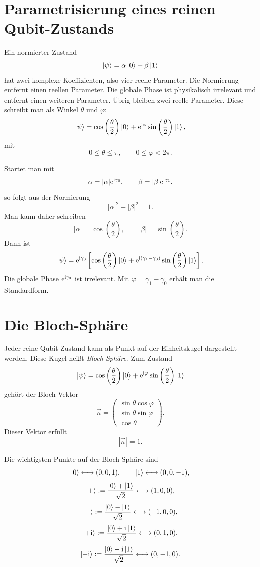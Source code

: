 \section{Parametrisierung eines reinen Qubit-Zustands}

Ein normierter Zustand
\[
    \left|\psi\right\rangle=\alpha\left|0\right\rangle+\beta\left|1\right\rangle
\]
hat zwei komplexe Koeffizienten, also vier reelle Parameter. Die Normierung entfernt einen reellen Parameter. Die globale Phase ist physikalisch irrelevant und entfernt einen weiteren Parameter. Übrig bleiben zwei reelle Parameter. Diese schreibt man als Winkel \(\theta\) und \(\varphi\):
\[
    \left|\psi\right\rangle
    =\cos\left(\frac{\theta}{2}\right)\left|0\right\rangle
    +\mathrm{e}^{\mathrm{i}\varphi}\sin\left(\frac{\theta}{2}\right)\left|1\right\rangle,
\]
mit
\[
    0\le \theta\le \pi,
    \qquad
    0\le \varphi<2\pi.
\]

\begin{derivationbox}
Startet man mit
\[
    \alpha=|\alpha|\mathrm{e}^{\mathrm{i}\gamma_0},
    \qquad
    \beta=|\beta|\mathrm{e}^{\mathrm{i}\gamma_1},
\]
so folgt aus der Normierung
\[
    |\alpha|^2+|\beta|^2=1.
\]
Man kann daher schreiben
\[
    |\alpha|=\cos\left(\frac{\theta}{2}\right),
    \qquad
    |\beta|=\sin\left(\frac{\theta}{2}\right).
\]
Dann ist
\[
    \left|\psi\right\rangle
    =\mathrm{e}^{\mathrm{i}\gamma_0}\left[
    \cos\left(\frac{\theta}{2}\right)\left|0\right\rangle
    +\mathrm{e}^{\mathrm{i}(\gamma_1-\gamma_0)}
    \sin\left(\frac{\theta}{2}\right)\left|1\right\rangle
    \right].
\]
Die globale Phase \(\mathrm{e}^{\mathrm{i}\gamma_0}\) ist irrelevant. Mit \(\varphi=\gamma_1-\gamma_0\) erhält man die Standardform.
\end{derivationbox}

\section{Die Bloch-Sphäre}

Jeder reine Qubit-Zustand kann als Punkt auf der Einheitskugel dargestellt werden. Diese Kugel heißt \emph{Bloch-Sphäre}. Zum Zustand
\[
    \left|\psi\right\rangle
    =\cos\left(\frac{\theta}{2}\right)\left|0\right\rangle
    +\mathrm{e}^{\mathrm{i}\varphi}\sin\left(\frac{\theta}{2}\right)\left|1\right\rangle
\]
gehört der Bloch-Vektor
\[
    \vec n
    =\begin{pmatrix}
        \sin\theta\cos\varphi\\
        \sin\theta\sin\varphi\\
        \cos\theta
    \end{pmatrix}.
\]
Dieser Vektor erfüllt
\[
    |\vec n|=1.
\]

\begin{formulabox}
Die wichtigsten Punkte auf der Bloch-Sphäre sind
\[
    \left|0\right\rangle\longleftrightarrow (0,0,1),
    \qquad
    \left|1\right\rangle\longleftrightarrow (0,0,-1),
\]
\[
    \left|+\right\rangle:=\frac{\left|0\right\rangle+\left|1\right\rangle}{\sqrt2}
    \longleftrightarrow (1,0,0),
\]
\[
    \left|-\right\rangle:=\frac{\left|0\right\rangle-\left|1\right\rangle}{\sqrt2}
    \longleftrightarrow (-1,0,0),
\]
\[
    \left|+\mathrm{i}\right\rangle:=\frac{\left|0\right\rangle+\mathrm{i}\left|1\right\rangle}{\sqrt2}
    \longleftrightarrow (0,1,0),
\]
\[
    \left|-\mathrm{i}\right\rangle:=\frac{\left|0\right\rangle-\mathrm{i}\left|1\right\rangle}{\sqrt2}
    \longleftrightarrow (0,-1,0).
\]
\end{formulabox}

